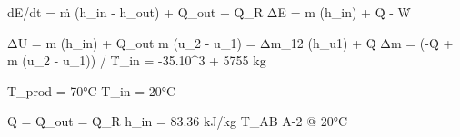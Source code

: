 dE/dt = ṁ (h_in - h_out) + Q̇_out + Q̇_R
ΔE = m (h_in) + Q̇ - Ẇ

ΔU = m (h_in) + Q_out
m (u_2 - u_1) = Δm_12 (h_u1) + Q̇
Δm = (-Q̇ + m (u_2 - u_1)) / Ṫ_in
= -35.10^3 + 5755 kg

T_prod = 70°C
T_in = 20°C

Q̇ = Q̇_out = Q̇_R
h_in = 83.36 kJ/kg
T_AB A-2 @ 20°C